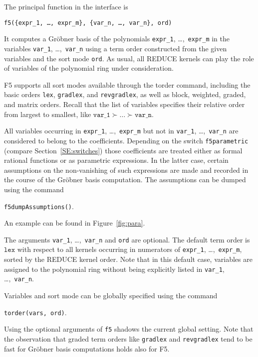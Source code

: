 \documentclass{article}
\newcommand{\grobner}{Gr\"obner}
\newcommand{\code}[1]{\texttt{#1}}
\begin{document}
The principal function in the interface is
%
\begin{center}
    \code{f5(\{expr\_1, \ldots, expr\_m\}, \{var\_n, \ldots, var\_n\}, ord)}
\end{center}
%
It computes a \grobner{} basis of the polynomials \code {expr\_1}, \dots,~\code{expr\_m} in the variables \code{var\_1}, \dots,~\code{var\_n} using a
term order constructed from the given variables and the sort mode \code{ord}. As usual, all REDUCE
kernels can play the role of variables of the polynomial ring under consideration. 

F5 supports all sort modes available through the torder command, including the basic orders \code{lex}, 
\code{gradlex}, and \code{revgradlex}, as well as block, weighted, graded, and matrix orders. 
Recall that the list of variables
specifies their relative order from largest to smallest, like $\code{var\_1} \succ \dots \succ
\code{var\_n}$.

All variables occurring in \code{expr\_1}, \dots,~\code{expr\_m} but not in \code{var\_1},
\dots,~\code{var\_n} are considered to belong to the coefficients. Depending on the switch
\code{f5para\-met\-ric} (compare Section~\ref{SE:switches}) those coefficients are treated either as
formal rational functions or as parametric expressions. In the latter case, certain assumptions on
the non-vanishing of such expressions are made and recorded in the course of the \grobner{} basis
computation. The assumptions can be dumped using the command
%
\begin{center}
\code{f5dumpAssumptions()}.
\end{center}
An example can be found in Figure~\ref{fig:para}.

The arguments \code{var\_1}, \dots,~\code{var\_n} and \code{ord} are optional. The default term
order is $\code{lex}$ with respect to all kernels occurring in numerators of \code{expr\_1},
\dots,~\code{expr\_m}, sorted by the REDUCE kernel order. Note that in this default case, variables
are assigned to the polynomial ring without being explicitly listed in \code{var\_1},
\dots,~\code{var\_n}.

Variables and sort mode can be globally specified using the command
%
\begin{center}
    \code{torder(vars, ord)}.
\end{center}
%
Using the optional arguments of \code{f5} shadows the current global
setting. Note that the observation that graded term orders like
\code{gradlex} and \code{revgradlex} tend to be fast for \grobner{}
basis computations \cite[\S5]{tolstaya} holds also for F5.
\end{document}
